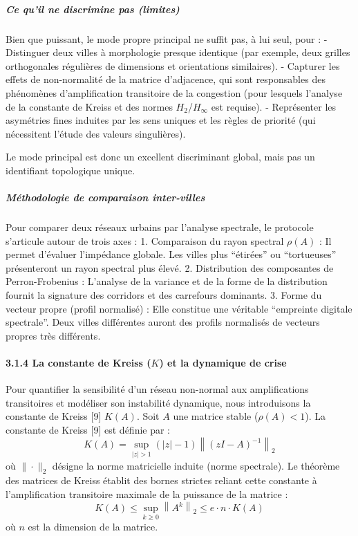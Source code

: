 \documentclass[10pt, a4paper]{article}
\begin{document}
\subparagraph{Ce qu'il ne discrimine pas
(limites)}\label{ce-quil-ne-discrimine-pas-limites}

Bien que puissant, le mode propre principal ne suffit pas, à lui seul,
pour : - Distinguer deux villes à morphologie presque identique (par
exemple, deux grilles orthogonales régulières de dimensions et
orientations similaires). - Capturer les effets de non-normalité de la
matrice d'adjacence, qui sont responsables des phénomènes
d'amplification transitoire de la congestion (pour lesquels l'analyse de
la constante de Kreiss et des normes \(H_2\)/\(H_\infty\) est requise).
- Représenter les asymétries fines induites par les sens uniques et les
règles de priorité (qui nécessitent l'étude des valeurs singulières).

Le mode principal est donc un excellent discriminant global, mais pas un
identifiant topologique unique.

\subparagraph{Méthodologie de comparaison
inter-villes}\label{muxe9thodologie-de-comparaison-inter-villes}

Pour comparer deux réseaux urbains par l'analyse spectrale, le protocole
s'articule autour de trois axes : 1. Comparaison du rayon spectral
\(\rho(A)\) : Il permet d'évaluer l'impédance globale. Les villes plus
``étirées'' ou ``tortueuses'' présenteront un rayon spectral plus élevé.
2. Distribution des composantes de Perron-Frobenius : L'analyse de la
variance et de la forme de la distribution fournit la signature des
corridors et des carrefours dominants. 3. Forme du vecteur propre
(profil normalisé) : Elle constitue une véritable ``empreinte digitale
spectrale''. Deux villes différentes auront des profils normalisés de
vecteurs propres très différents.

\paragraph{\texorpdfstring{3.1.4 La constante de Kreiss (\(K\)) et la
dynamique de
crise}{3.1.4 La constante de Kreiss (K) et la dynamique de crise}}\label{la-constante-de-kreiss-k-et-la-dynamique-de-crise}

Pour quantifier la sensibilité d'un réseau non-normal aux amplifications
transitoires et modéliser son instabilité dynamique, nous introduisons
la constante de Kreiss {[}9{]} \(K(A)\). Soit \(A\) une matrice stable
(\(\rho(A) < 1\)). La constante de Kreiss {[}9{]} est définie par :
\[K(A) = \sup _{|z| > 1} (|z| - 1) \left\| (zI - A)^{-1} \right\|_2\] où
\(\|\cdot\|_2\) désigne la norme matricielle induite (norme spectrale).
Le théorème des matrices de Kreiss établit des bornes strictes reliant
cette constante à l'amplification transitoire maximale de la puissance
de la matrice :
\[K(A) \le \sup_{k \ge 0} \left\| A^k \right\|_2 \le e \cdot n \cdot K(A)\]
où \(n\) est la dimension de la matrice.
\end{document}
